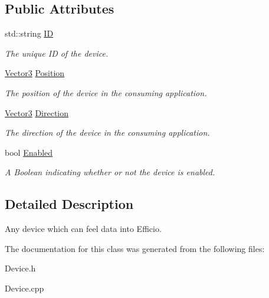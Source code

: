 \subsection*{Public Attributes}
\begin{DoxyCompactItemize}
\item 
std\+::string \hyperlink{class_efficio_1_1_device_ade0a5b10efa326ba8c4fdd9e37d89084}{ID}\hypertarget{class_efficio_1_1_device_ade0a5b10efa326ba8c4fdd9e37d89084}{}\label{class_efficio_1_1_device_ade0a5b10efa326ba8c4fdd9e37d89084}

\begin{DoxyCompactList}\small\item\em The unique ID of the device. \end{DoxyCompactList}\item 
\hyperlink{class_efficio_1_1_vector3}{Vector3} \hyperlink{class_efficio_1_1_device_a21ba05537c6978805f090e13c62ed220}{Position}\hypertarget{class_efficio_1_1_device_a21ba05537c6978805f090e13c62ed220}{}\label{class_efficio_1_1_device_a21ba05537c6978805f090e13c62ed220}

\begin{DoxyCompactList}\small\item\em The position of the device in the consuming application. \end{DoxyCompactList}\item 
\hyperlink{class_efficio_1_1_vector3}{Vector3} \hyperlink{class_efficio_1_1_device_a4da01030cb4382f23700edce87756b16}{Direction}\hypertarget{class_efficio_1_1_device_a4da01030cb4382f23700edce87756b16}{}\label{class_efficio_1_1_device_a4da01030cb4382f23700edce87756b16}

\begin{DoxyCompactList}\small\item\em The direction of the device in the consuming application. \end{DoxyCompactList}\item 
bool \hyperlink{class_efficio_1_1_device_ae724390ac1fadd47e528e0231bacf290}{Enabled}\hypertarget{class_efficio_1_1_device_ae724390ac1fadd47e528e0231bacf290}{}\label{class_efficio_1_1_device_ae724390ac1fadd47e528e0231bacf290}

\begin{DoxyCompactList}\small\item\em A Boolean indicating whether or not the device is enabled. \end{DoxyCompactList}\end{DoxyCompactItemize}


\subsection{Detailed Description}
Any device which can feel data into Efficio. 

The documentation for this class was generated from the following files\+:\begin{DoxyCompactItemize}
\item 
Device.\+h\item 
Device.\+cpp\end{DoxyCompactItemize}
